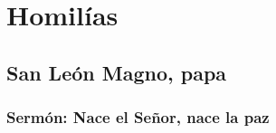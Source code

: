 \newsection

\section{Homilías}
\homiliasNavidad

\subsection{San León Magno, papa}

\subsubsection{Sermón: Nace el Señor, nace la paz}


